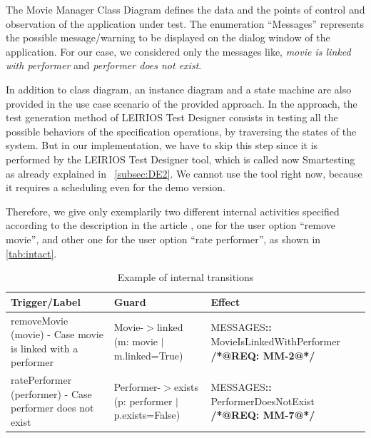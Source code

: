 The Movie Manager Class Diagram defines the data and the points of control and observation of the application under test. The enumeration \enquote{Messages} represents the possible message/warning to be displayed on the dialog window of the application. For our case, we considered only the messages like, \textit{movie is linked with performer} and \textit{performer does not exist}.

In addition to class diagram, an instance diagram and a state machine are also provided in the use case scenario of the provided approach. In the approach, the test generation method of LEIRIOS Test Designer consists in testing all the possible behaviors of the specification operations, by traversing the states of the system. But in our implementation, we have to skip this step since it is performed by the LEIRIOS Test Designer tool, which is called now Smartesting as already explained in ~\autoref{subsec:DE2}. We cannot use the tool right now, because it requires a scheduling even for the demo version. 

Therefore, we give only exemplarily two different internal activities specified according to the description in the article \cite{Paper2}, one for the user option \enquote{remove movie}, and other one for the user option \enquote{rate performer}, as shown in \autoref{tab:intact}. 

\begin{table} [H] 
	\begin{small}
  \begin{center}
  \begin{scriptsize}
\caption{Example of internal transitions}
\label{tab:intact}
\begin{tabular}{  m{3.3cm} | m{3.4cm} | m{6.4cm}  }
\hline
\textbf{Trigger/Label}& \textbf{Guard}&\textbf{Effect}   \\
\hline
removeMovie (movie)
\newline- Case movie is linked with a performer & Movie-$>$linked (m: movie $|$ m.linked=True) & MESSAGES\textbf{::} MovieIsLinkedWithPerformer \textbf{/*@REQ: MM-2@*/}\\
\hline
ratePerformer (performer)
\newline- Case performer does not exist & Performer-$>$exists (p: performer $|$ p.exists=False) & MESSAGES\textbf{::} PerformerDoesNotExist \textbf{/*@REQ: MM-7@*/ }\\
\hline
\end{tabular}
\end{scriptsize}
 \end{center}
\end{small}
\end{table}

